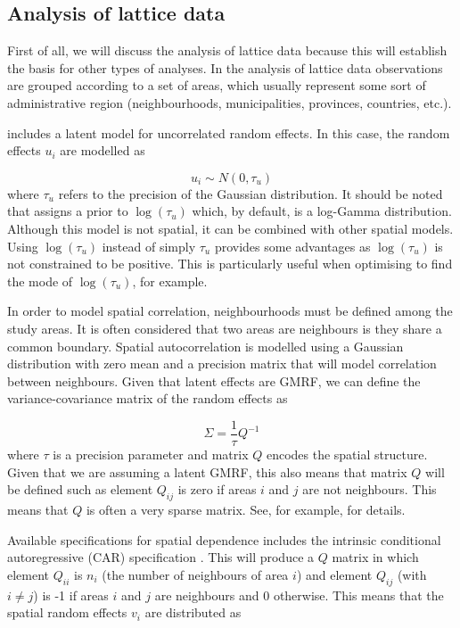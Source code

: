 \documentclass[article]{jss}
\begin{document}
\subsection{Analysis of lattice data}

First of all, we will discuss the analysis of lattice data because this will
establish the basis for other types of analyses. In the analysis of lattice data
observations are grouped according to a set of areas, which usually represent
some sort of administrative region (neighbourhoods, municipalities, provinces,
countries, etc.).

 includes a latent model for uncorrelated random effects. In
this case, the random effects $u_i$ are modelled as

\begin{equation}
u_i \sim N(0, \tau_u)
\end{equation}
\noindent
where $\tau_u$ refers to the precision of the Gaussian distribution.  It should
be noted that  assigns a prior to $\log(\tau_u)$ which, by default,
is a log-Gamma  distribution. Although this model is not spatial, it can be
combined with other spatial models. Using $\log(\tau_u)$ instead
of simply $\tau_u$ provides some advantages as $\log(\tau_u)$ is not
constrained to be positive. This is particularly useful when optimising
to find the mode of $\log(\tau_u)$, for example.


In order to model spatial correlation, neighbourhoods must be defined among the
study areas.  It is often considered that two areas are neighbours is they
share a common boundary.  Spatial autocorrelation is modelled using a Gaussian
distribution with zero mean and a precision matrix that will model
correlation between neighbours. Given that latent effects are GMRF, 
we can define the variance-covariance matrix of the random effects
as

\begin{equation}
\Sigma = \frac{1}{\tau} Q^{-1}
\end{equation}
\noindent
where $\tau$ is a precision parameter and matrix $Q$ encodes
the spatial structure. Given that we are assuming a latent GMRF, this also
means that matrix $Q$ will be defined such as element $Q_{ij}$ is zero if
areas $i$ and $j$ are not neighbours. This means that $Q$ is often a very
sparse matrix. See, for example, \citet{rueheld:2005} 
for details.

Available specifications for spatial dependence includes the intrinsic 
conditional autoregressive (CAR)
specification \citep{besagetal:1991}. This will produce a $Q$ matrix in which
element $Q_{ii}$ is $n_i$ (the number of neighbours of area $i$) and element
$Q_{ij}$ (with $i\neq j$) is -1 if areas $i$ and $j$ are neighbours and 0 otherwise. This
means that the spatial random effects $v_i$ are distributed as
\end{document}
